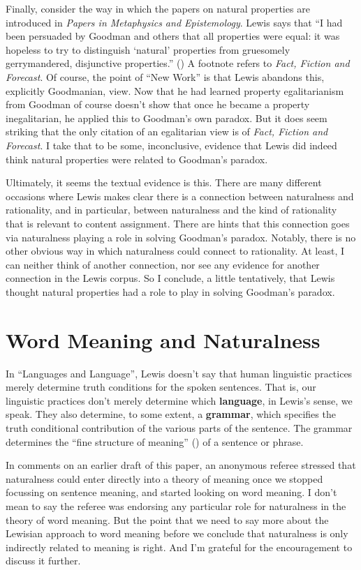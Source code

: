 \documentclass[
  10pt,
  letterpaper,
  DIV=11,
  numbers=noendperiod,
  twoside]{scrartcl}
\begin{document}
Finally, consider the way in which the papers on natural properties are
introduced in \emph{Papers in Metaphysics and Epistemology}. Lewis says
that ``I had been persuaded by Goodman and others that all properties
were equal: it was hopeless to try to distinguish `natural' properties
from gruesomely gerrymandered, disjunctive properties.''
() A footnote refers to
\emph{Fact, Fiction and Forecast}. Of course, the point of ``New Work''
is that Lewis abandons this, explicitly Goodmanian, view. Now that he
had learned property egalitarianism from Goodman of course doesn't show
that once he became a property inegalitarian, he applied this to
Goodman's own paradox. But it does seem striking that the only citation
of an egalitarian view is of \emph{Fact, Fiction and Forecast}. I take
that to be some, inconclusive, evidence that Lewis did indeed think
natural properties were related to Goodman's paradox.

Ultimately, it seems the textual evidence is this. There are many
different occasions where Lewis makes clear there is a connection
between naturalness and rationality, and in particular, between
naturalness and the kind of rationality that is relevant to content
assignment. There are hints that this connection goes via naturalness
playing a role in solving Goodman's paradox. Notably, there is no other
obvious way in which naturalness could connect to rationality. At least,
I can neither think of another connection, nor see any evidence for
another connection in the Lewis corpus. So I conclude, a little
tentatively, that Lewis thought natural properties had a role to play in
solving Goodman's paradox.

\section{Word Meaning and
Naturalness}\label{word-meaning-and-naturalness}

In ``Languages and Language'', Lewis doesn't say that human linguistic
practices merely determine truth conditions for the spoken sentences.
That is, our linguistic practices don't merely determine which
\textbf{language}, in Lewis's sense, we speak. They also determine, to
some extent, a \textbf{grammar}, which specifies the truth conditional
contribution of the various parts of the sentence. The grammar
determines the ``fine structure of meaning''
() of a sentence or phrase.

In comments on an earlier draft of this paper, an anonymous referee
stressed that naturalness could enter directly into a theory of meaning
once we stopped focussing on sentence meaning, and started looking on
word meaning. I don't mean to say the referee was endorsing any
particular role for naturalness in the theory of word meaning. But the
point that we need to say more about the Lewisian approach to word
meaning before we conclude that naturalness is only indirectly related
to meaning is right. And I'm grateful for the encouragement to discuss
it further.
\end{document}
